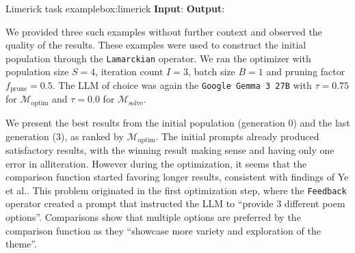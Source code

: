 \begin{figurebox}{Limerick task example}{box:limerick}
    \textbf{Input}:
    \textbf{Output}:
\end{figurebox}

We provided three such examples without further context and observed the quality of the results. These examples were used to construct the initial population through
the \texttt{Lamarckian} operator.
We ran the optimizer with population size $S=4$, iteration count $I=3$, batch size $B=1$ and pruning factor $f_{\text{prune}} = 0.5$.
The LLM of choice was again the \texttt{Google Gemma 3 27B} with $\tau = 0.75$ for $\mathscr{M}_{\text{optim}}$ and $\tau = 0.0$ for $\mathscr{M}_{\text{solve}}$.

We present the best results from the initial population (generation $0$) and the last generation ($3$), as ranked by $\mathscr{M}_{\text{optim}}$.
The initial prompts already produced satisfactory results, with the winning result making sense and having only one error in alliteration.
However during the optimization, it seems that the comparison function started favoring longer results, consistent with findings of Ye et al.\cite{ye2024justiceprejudicequantifyingbiases}.
This problem originated in the first optimization step, where the \texttt{Feedback} operator created a prompt that instructed the LLM to ``provide 3 different poem options''.
Comparisons show that multiple options are preferred by the comparison function as they ``showcase more variety and exploration of the theme''.

